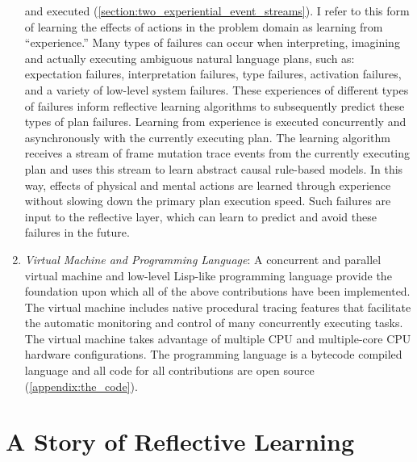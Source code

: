 \begin{enumerate}
  and executed
  ({\mbox{\autoref{section:two_experiential_event_streams}}}).  I
  refer to this form of learning the effects of actions in the problem
  domain as learning from ``experience.''  Many types of failures can
  occur when interpreting, imagining and actually executing ambiguous
  natural language plans, such as: expectation failures,
  interpretation failures, type failures, activation failures, and a
  variety of low-level system failures.  These experiences of
  different types of failures inform reflective learning algorithms to
  subsequently predict these types of plan failures.  Learning from
  experience is executed concurrently and asynchronously with the
  currently executing plan.  The learning algorithm receives a stream
  of frame mutation trace events from the currently executing plan and
  uses this stream to learn abstract causal rule-based models.  In
  this way, effects of physical and mental actions are learned through
  experience without slowing down the primary plan execution speed.
  Such failures are input to the reflective layer, which can learn to
  predict and avoid these failures in the future.
\item \emph{Virtual Machine and Programming Language}: A concurrent
  and parallel virtual machine and low-level Lisp-like programming
  language provide the foundation upon which all of the above
  contributions have been implemented.  The virtual machine includes
  native procedural tracing features that facilitate the automatic
  monitoring and control of many concurrently executing tasks.  The
  virtual machine takes advantage of multiple CPU and multiple-core
  CPU hardware configurations.  The programming language is a bytecode
  compiled language and all code for all contributions are open source
  ({\mbox{\autoref{appendix:the_code}}}).
\end{enumerate}

\section{A Story of Reflective Learning}

